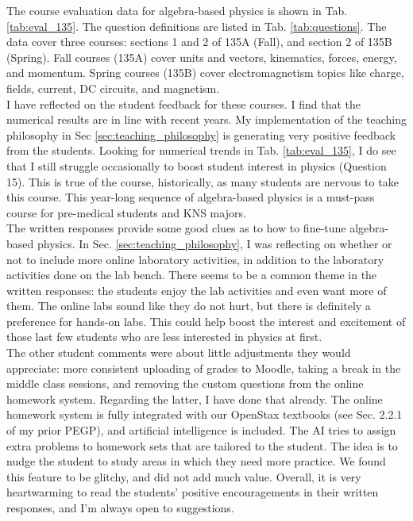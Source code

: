 \documentclass[../../main.tex]{subfiles}
\begin{document}
The course evaluation data for algebra-based physics is shown in Tab. \ref{tab:eval_135}.  The question definitions are listed in Tab. \ref{tab:questions}.  The data cover three courses: sections 1 and 2 of 135A (Fall), and section 2 of 135B (Spring).  Fall courses (135A) cover units and vectors, kinematics, forces, energy, and momentum.  Spring courses (135B) cover electromagnetism topics like charge, fields, current, DC circuits, and magnetism.
\\
\vspace{0.25cm}
I have reflected on the student feedback for these courses.  I find that the numerical results are in line with recent years.  My implementation of the teaching philosophy in Sec \ref{sec:teaching_philosophy} is generating very positive feedback from the students.  Looking for numerical trends in Tab. \ref{tab:eval_135}, I do see that I still struggle occasionally to boost student interest in physics (Question 15).  This is true of the course, historically, as many students are nervous to take this course.  This year-long sequence of algebra-based physics is a must-pass course for pre-medical students and KNS majors.
\\
\vspace{0.25cm}
The written responses provide some good clues as to how to fine-tune algebra-based physics.  In Sec. \ref{sec:teaching_philosophy}, I was reflecting on whether or not to include more online laboratory activities, in addition to the laboratory activities done on the lab bench.  There seems to be a common theme in the written responses: the students enjoy the lab activities and even want more of them.  The online labs sound like they do not hurt, but there is definitely a preference for hands-on labs.  This could help boost the interest and excitement of those last few students who are less interested in physics at first.
\\
\vspace{0.25cm}
The other student comments were about little adjustments they would appreciate: more consistent uploading of grades to Moodle, taking a break in the middle class sessions, and removing the custom questions from the online homework system.  Regarding the latter, I have done that already.  The online homework system is fully integrated with our OpenStax textbooks (see Sec. 2.2.1 of my prior PEGP), and artificial intelligence is included.  The AI tries to assign extra problems to homework sets that are tailored to the student.  The idea is to nudge the student to study areas in which they need more practice.  We found this feature to be glitchy, and did not add much value.  Overall, it is very heartwarming to read the students' positive encouragements in their written responses, and I'm always open to suggestions.
\end{document}
